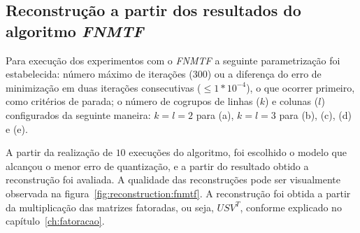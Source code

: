\documentclass[
    12pt,                %
    oneside,            %
    a4paper,            %
    english,            %
    brazil                %
    ]{abntex2ppgsi}
\begin{document}
\begin{figure}[H]
\begin{subfigure}[b]{0.18\textwidth}
    \end{subfigure}
\label{fig:reconstruction-2:onmtf}
\end{figure}

\subsection{Reconstrução a partir dos resultados do algoritmo \textit{FNMTF}}
\label{subsec:results-reconstruction-fnmtf}

Para execução dos experimentos com o \textit{FNMTF} a seguinte parametrização foi estabelecida: número máximo de iterações ($300$) ou a diferença do erro de minimização em duas iterações consecutivas ($\leq 1 * 10^{-4}$), o que ocorrer primeiro, como critérios de parada; o número de cogrupos de linhas ($k$) e colunas ($l$) configurados da seguinte maneira: $k = l = 2$ para (a), $k = l = 3 $ para (b), (c), (d) e (e).

A partir da realização de $10$ execuções do algoritmo, foi escolhido o modelo que alcançou o menor erro de quantização, e a partir do resultado obtido a reconstrução foi avaliada.
A qualidade das reconstruções pode ser visualmente observada na figura~\ref{fig:reconstruction:fnmtf}.
A reconstrução foi obtida a partir da multiplicação das matrizes fatoradas, ou seja, $USV^T$, conforme explicado no capítulo~\ref{ch:fatoracao}.
\end{document}
